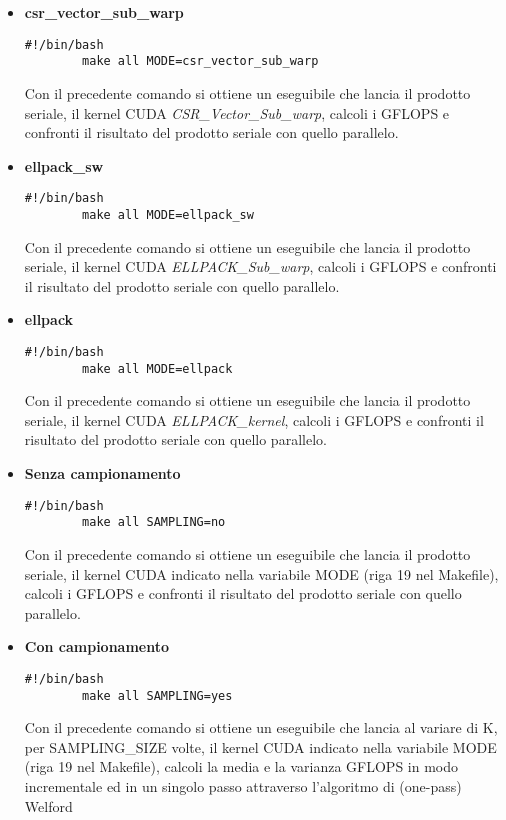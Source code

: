 \documentclass{article}
\begin{document}
\begin{itemize}
\begin{itemize}
        \item \textbf{csr\_vector\_sub\_warp}
        \begin{lstlisting}[style=bashstyle]
        #!/bin/bash
        make all MODE=csr_vector_sub_warp
        \end{lstlisting} Con il precedente comando si ottiene un eseguibile che lancia il prodotto seriale, il kernel CUDA \textit{CSR\_Vector\_Sub\_warp}, calcoli i GFLOPS e confronti il risultato del prodotto seriale con quello parallelo. 
        \item \textbf{ellpack\_sw}
        \begin{lstlisting}[style=bashstyle]
        #!/bin/bash
        make all MODE=ellpack_sw
        \end{lstlisting} Con il precedente comando si ottiene un eseguibile che lancia il prodotto seriale, il kernel CUDA \textit{ELLPACK\_Sub\_warp}, calcoli i GFLOPS e confronti il risultato del prodotto seriale con quello parallelo. 
        \item \textbf{ellpack}
        \begin{lstlisting}[style=bashstyle]
        #!/bin/bash
        make all MODE=ellpack
        \end{lstlisting} Con il precedente comando si ottiene un eseguibile che lancia il prodotto seriale, il kernel CUDA \textit{ELLPACK\_kernel}, calcoli i GFLOPS e confronti il risultato del prodotto seriale con quello parallelo. 
    \end{itemize}

    \begin{itemize}
            \item[\Checkmark] \textbf{Senza campionamento}
         \begin{lstlisting}[style=bashstyle]
        #!/bin/bash
        make all SAMPLING=no
        \end{lstlisting} Con il precedente comando si ottiene un eseguibile che lancia il prodotto seriale, il kernel CUDA indicato nella variabile MODE (riga 19 nel Makefile), calcoli i GFLOPS e confronti il risultato del prodotto seriale con quello parallelo. 
        \item[\Checkmark] \textbf{Con campionamento}
        \begin{lstlisting}[style=bashstyle]
        #!/bin/bash
        make all SAMPLING=yes
        \end{lstlisting} Con il precedente comando si ottiene un eseguibile che lancia al variare di K, per SAMPLING\_SIZE volte, il kernel CUDA indicato nella variabile MODE (riga 19 nel Makefile), calcoli la media e la varianza GFLOPS in modo incrementale ed in un singolo passo attraverso l'algoritmo di (one-pass) Welford
    \end{itemize}
\end{itemize}
\end{document}
